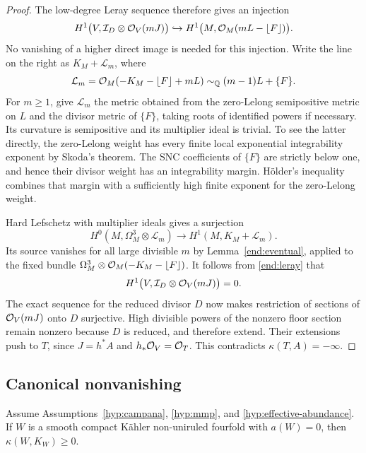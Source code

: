 \begin{proof}
The low-degree Leray sequence therefore gives an injection
\begin{equation}\label{end:leray}
 H^1\bigl(V,\mathcal I_D\otimes\mathcal{O}_V(mJ)\bigr)
 \hookrightarrow
 H^1\bigl(M,\mathcal{O}_M(mL-\lfloor F\rfloor)\bigr).
\end{equation}
No vanishing of a higher direct image is needed for this injection.
Write the line on the right as \(K_M+\mathcal L_m\), where
\begin{equation}\label{end:hl-line}
 \mathcal L_m=
 \mathcal{O}_M(-K_M-\lfloor F\rfloor+mL)
 \sim_{\mathbb{Q}}(m-1)L+\{F\}.
\end{equation}
For \(m\ge1\), give \(\mathcal L_m\) the metric obtained from
the zero-Lelong semipositive metric on \(L\) and the divisor metric
of \(\{F\}\), taking roots of identified powers if necessary.
Its curvature is semipositive and its multiplier ideal is trivial.
To see the latter directly, the zero-Lelong weight has every finite
local exponential integrability exponent by Skoda's theorem. The
SNC coefficients of \(\{F\}\) are strictly below one, and hence
their divisor weight has an integrability margin. H\"older's
inequality combines that margin with a sufficiently high finite
exponent for the zero-Lelong weight.

Hard Lefschetz with multiplier ideals
\cite[Theorem~0.1]{DPSHardLefschetz} gives a surjection
\[
 H^0(M,\Omega_M^3\otimes\mathcal L_m)
   \longrightarrow H^1(M,K_M+\mathcal L_m).
\]
Its source vanishes for all large divisible \(m\) by
Lemma~\ref{end:eventual}, applied to the fixed bundle
\(\Omega_M^3\otimes\mathcal{O}_M(-K_M-\lfloor F\rfloor)\).
It follows from \eqref{end:leray} that
\[
 H^1\bigl(V,\mathcal I_D\otimes\mathcal{O}_V(mJ)\bigr)=0.
\]
The exact sequence for the reduced divisor \(D\) now makes
restriction of sections of \(\mathcal{O}_V(mJ)\) onto \(D\)
surjective. High divisible powers of the nonzero floor section
remain nonzero because \(D\) is reduced, and therefore extend.
Their extensions push to \(T\), since \(J=h^*A\) and
\(h_*\mathcal{O}_V=\mathcal{O}_T\). This contradicts
\(\kappa(T,A)=-\infty\).
\end{proof}

\subsection{Canonical nonvanishing}

\begin{theorem}\label{end:canonical}
Assume Assumptions~\ref{hyp:campana}, \ref{hyp:mmp}, and
\ref{hyp:effective-abundance}. If \(W\) is a smooth compact
K\"ahler non-uniruled fourfold with \(a(W)=0\), then
\(\kappa(W,K_W)\ge0\).
\end{theorem}

